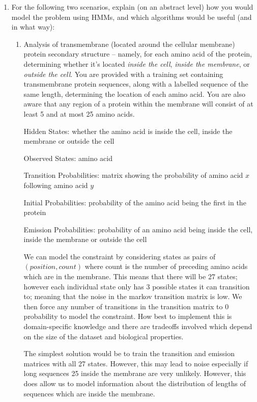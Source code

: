 \documentclass[10pt,\jkfside,a4paper]{article}
\begin{document}
\begin{enumerate}
    \item For the following two scenarios, explain (on an abstract level) how you would model the problem using HMMs, and which algorithms would be useful (and in what way):

    \begin{enumerate}

        \item Analysis of transmembrane (located around the cellular membrane) protein secondary structure -- namely, for each amino acid of the protein, determining whether it's located \textit{inside the
        cell}, \textit{inside the membrane}, or \textit{outside the cell}. You are provided with a training set containing transmembrane protein sequences, along with a labelled sequence of the same length,
        determining the location of each amino acid. You are also aware that any region of a protein within the membrane will consist of at least 5 and at most 25 amino acids.

        Hidden States: whether the amino acid is inside the cell, inside the membrane or outside the cell

        Observed States: amino acid

        Transition Probabilities: matrix showing the probability of amino acid $x$ following amino acid $y$

        Initial Probabilities: probability of the amino acid being the first in the protein

        Emission Probabilities: probability of an amino acid being inside the cell, inside the membrane or outside the cell

        We can model the constraint by considering states as pairs of $(\mathit{position}, \mathit{count})$ where count is the number of preceding amino acids which are in the membrane. This means that there
        will be 27 states; however each individual state only has 3 possible states it can transition to; meaning that the noise in the markov transition matrix is low. We then force any number of transitions
        in the transition matrix to 0 probability to model the constraint. How best to implement this is domain-specific knowledge and there are tradeoffs involved which depend on the size of the dataset and
        biological properties.

        The simplest solution would be to train the transition and emission matrices with all 27 states. However, this may lead to noise especially if long sequences 25 inside the membrane are very unlikely.
        However, this does allow us to model information about the distribution of lengths of sequences which are inside the membrane.


\end{enumerate}
\end{enumerate}
\end{document}
